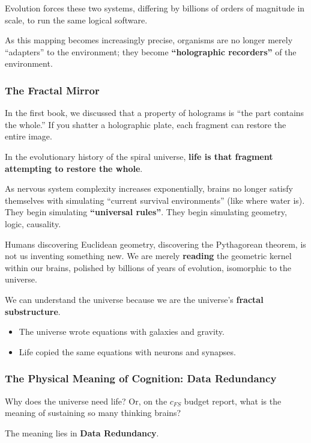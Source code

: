 Evolution forces these two systems, differing by billions of orders of magnitude in scale, to run the same logical software.

As this mapping becomes increasingly precise, organisms are no longer merely ``adapters'' to the environment; they become \textbf{``holographic recorders''} of the environment.

\subsubsection{The Fractal Mirror}

In the first book, we discussed that a property of holograms is ``the part contains the whole.'' If you shatter a holographic plate, each fragment can restore the entire image.

In the evolutionary history of the spiral universe, \textbf{life is that fragment attempting to restore the whole}.

As nervous system complexity increases exponentially, brains no longer satisfy themselves with simulating ``current survival environments'' (like where water is). They begin simulating \textbf{``universal rules''}. They begin simulating geometry, logic, causality.

Humans discovering Euclidean geometry, discovering the Pythagorean theorem, is not us inventing something new. We are merely \textbf{reading} the geometric kernel within our brains, polished by billions of years of evolution, isomorphic to the universe.

We can understand the universe because we are the universe's \textbf{fractal substructure}.

\begin{itemize}
\item The universe wrote equations with galaxies and gravity.

\item Life copied the same equations with neurons and synapses.
\end{itemize}

\subsubsection{The Physical Meaning of Cognition: Data Redundancy}

Why does the universe need life? Or, on the $c_{FS}$ budget report, what is the meaning of sustaining so many thinking brains?

The meaning lies in \textbf{Data Redundancy}.

